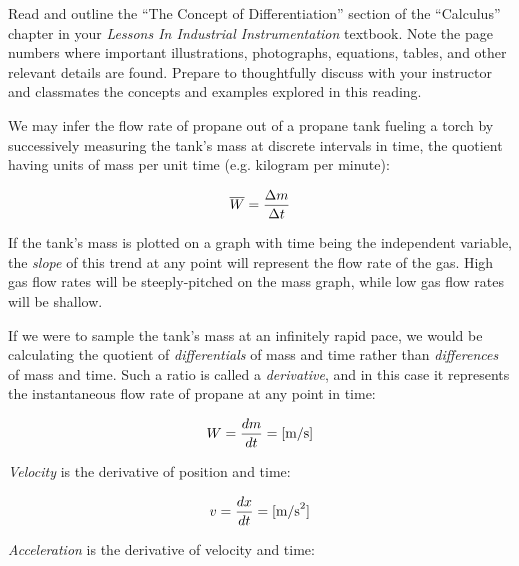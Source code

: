 

Read and outline the ``The Concept of Differentiation'' section of the ``Calculus'' chapter in your {\it Lessons In Industrial Instrumentation} textbook.  Note the page numbers where important illustrations, photographs, equations, tables, and other relevant details are found.  Prepare to thoughtfully discuss with your instructor and classmates the concepts and examples explored in this reading.














We may infer the flow rate of propane out of a propane tank fueling a torch by successively measuring the tank's mass at discrete intervals in time, the quotient having units of mass per unit time (e.g. kilogram per minute):

$$\overline{W} = {\Delta m \over \Delta t}$$

If the tank's mass is plotted on a graph with time being the independent variable, the {\it slope} of this trend at any point will represent the flow rate of the gas.  High gas flow rates will be steeply-pitched on the mass graph, while low gas flow rates will be shallow.

\vskip 10pt

If we were to sample the tank's mass at an infinitely rapid pace, we would be calculating the quotient of {\it differentials} of mass and time rather than {\it differences} of mass and time.  Such a ratio is called a {\it derivative}, and in this case it represents the instantaneous flow rate of propane at any point in time:

$$W = {dm \over dt} = [\hbox{m/s}]$$

\vskip 10pt

{\it Velocity} is the derivative of position and time:

$$v = {dx \over dt} = [\hbox{m/s}^2]$$

\vskip 10pt

{\it Acceleration} is the derivative of velocity and time:


